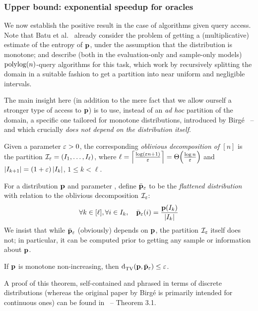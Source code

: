 \subsubsection{Upper bound: exponential speedup for \cdfsamp oracles}
We now establish the positive result in the case of algorithms given \cdfsamp query access. Note that Batu et al.~\cite{BDKR:05} already consider the problem of getting a (multiplicative) estimate of the entropy of $\mathbf{p}$, under the assumption that the distribution is monotone; and describe (both in the evaluation-only and sample-only models) $\operatorname*{poly}\!\log(n)$-query algorithms for this task, which work by recursively splitting the domain in a suitable fashion to get a partition into near uniform and negligible intervals.

The main insight here (in addition to the mere fact that we allow ourself a stronger type of access to $\mathbf{p}$) is to use, instead of an \emph{ad hoc} partition of the domain, a specific one tailored for monotone distributions, introduced by Birg\'e~\cite{Birge:87} -- and which crucially \emph{does not depend on the distribution itself}.

\begin{definition}\label{def:birge:obl:decomp}
  Given a parameter $\varepsilon>0$, the corresponding \emph{oblivious decomposition of $[n]$} is the partition $\mathcal{I}_\varepsilon=(I_1,\dots,I_\ell)$, where $\ell=\clg{\frac{\log( \eps n + 1)}{\eps}}=\bigTheta{\frac{\log n }{\eps}}$ and $\left\lvert I_{k+1} \right\rvert=(1+\varepsilon)\left\lvert I_{k} \right\rvert$, $1\leq k < \ell$.
\end{definition}

\noindent For a distribution $\mathbf{p}$ and parameter \eps, define $\bar{\mathbf{p}}_\varepsilon$ to be the \emph{flattened distribution} with relation to the oblivious decomposition $\mathcal{I}_\varepsilon$:
\[ \forall k\in [\ell], \forall i\in I_k,\quad \bar{\mathbf{p}}_\varepsilon(i) = \frac{\mathbf{p}(I_k)}{\left\lvert I_k \right\rvert} \]
We insist that while $\bar{\mathbf{p}}_\varepsilon$ (obviously) depends on $\mathbf{p}$, the partition $\mathcal{I}_\varepsilon$ itself does not; in particular, it can be computed prior to getting any sample or information about $\mathbf{p}$.

\begin{theorem}\label{theorem:birge:obl:decomp}
 If $\mathbf{p}$ is monotone non-increasing, then ${\operatorname{d}_{\textrm{TV}}^{}\!\left({\mathbf{p}, \bar{\mathbf{p}}_\varepsilon}\right)} \leq \varepsilon$.
\end{theorem}

\begin{remark} A proof of this theorem, self-contained and phrased in terms of discrete distributions (whereas the original paper by Birg\'e is primarily intended for continuous ones) can be found in~\cite{DDSVV:13} -- Theorem 3.1.
\end{remark}

